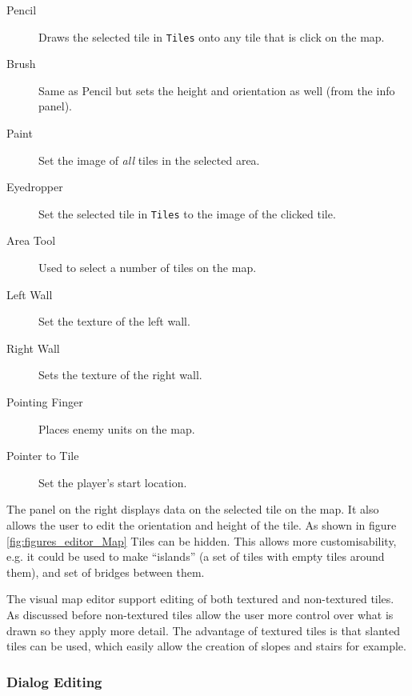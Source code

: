 \begin{description}
	\item[Pencil] Draws the selected tile in \texttt{Tiles} onto any tile that is click on the map.
	\item[Brush]  Same as Pencil but sets the height and orientation as well (from the info panel).
	\item[Paint]  Set the image of \emph{all} tiles in the selected area.
	\item[Eyedropper]  Set the selected tile in \texttt{Tiles} to the image of the clicked tile.
	\item[Area Tool]  Used to select a number of tiles on the map.
	\item[Left Wall]  Set the texture of the left wall.
	\item[Right Wall] Sets the texture of the right wall.
	\item[Pointing Finger]  Places enemy units on the map.
	\item[Pointer to Tile]  Set the player's start location.
\end{description}

The panel on the right displays data on the selected tile on the map. It also allows the user to edit the orientation and height of the tile.  As shown in figure \ref{fig:figures_editor_Map}  Tiles can be hidden. This allows more customisability, e.g. it could be used to make ``islands''  (a set of tiles with empty tiles around them),  and set of bridges between them. 

The visual map editor support editing  of both textured and non-textured tiles. As discussed before non-textured tiles allow the user more control over what is drawn so they  apply more detail. The advantage of textured tiles is that slanted tiles can be used, which easily allow the creation of slopes and stairs for example.


\clearpage
\subsubsection{Dialog Editing}
\label{ssub:dialog_editing}

